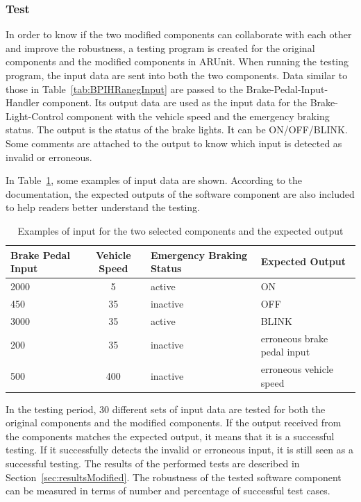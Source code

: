\subsubsection{Test}
In order to know if the two modified components can collaborate with each other and improve the robustness, a testing program is created for the original components and the modified components in ARUnit. When running the testing program, the input data are sent into both the two components. Data similar to those in Table~\ref{tab:BPIHRanegInput} are passed to the Brake-Pedal-Input-Handler component. Its output data are used as the input data for the Brake-Light-Control component with the vehicle speed and the emergency braking status. The output is the status of the brake lights. It can be ON/OFF/BLINK. Some comments are attached to the output to know which input is detected as invalid or erroneous. 

In Table~\ref{tab:inputData}, some examples of input data are shown. According to the documentation, the expected outputs of the software component are also included to help readers better understand the testing. 

\begin{table}[htb]\footnotesize
\centering
\begin{tabular}{|p{1.5cm}|c|p{1.9cm}|p{1.9cm}|}\hline
Brake Pedal Input& Vehicle Speed & Emergency Braking Status & Expected Output \\ \hline
2000 & 5 & active & ON\\ \hline
450 & 35 & inactive & OFF\\ \hline
3000 & 35 & active & BLINK\\ \hline
200 & 35 & inactive & erroneous brake pedal input\\ \hline
500 & 400 & inactive & erroneous vehicle speed\\ \hline
\end{tabular}
\caption{Examples of input for the two selected components and the expected output}
\label{tab:inputData}
\vspace{-.4cm}
\end{table}


In the testing period, 30 different sets of input data are tested for both the original components and the modified components. If the output received from the components matches the expected output, it means that it is a successful testing. If it successfully detects the invalid or erroneous input, it is still seen as a successful testing. The results of the performed tests are described in Section~\ref{sec:resultsModified}. The robustness of the tested software component can be measured in terms of number and percentage of successful test cases.



